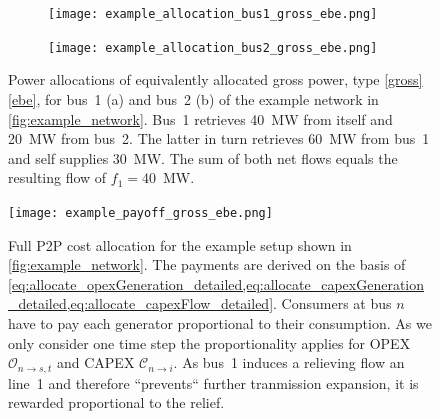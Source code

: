 \documentclass[11pt,twocolumn]{article}
\newcommand{\opex}{\mathcal{O}}
\newcommand{\allocateopex}[1][n \rightarrow s]{\opex_{#1,t}}
\begin{document}
% 
\begin{figure}[h!]
    \begin{subfigure}[c]{.495\linewidth}
    \texttt{[image: example\_allocation\_bus1\_gross\_ebe.png]}
    \vspace{-40pt}
    \subcaption{}
    \label{fig:example_allocation_bus1}
    \end{subfigure}
    \begin{subfigure}[c]{.495\linewidth}
    \texttt{[image: example\_allocation\_bus2\_gross\_ebe.png]}
    \vspace{-40pt}
    \subcaption{}
    \label{fig:example_allocation_bus2_gross_ebe}
    \end{subfigure}
    \caption{Power allocations of equivalently allocated gross power, type \ref{gross}\ref{ebe}, for bus~1 (a) and bus~2 (b) of the example network in \cref{fig:example_network}. Bus~1 retrieves 40~MW from itself and 20~MW from bus~2. The latter in turn retrieves 60~MW from bus~1 and self supplies 30~MW.
    The sum of both net flows equals the resulting flow of $f_1=40$~MW. \vspace{-0pt}}
    \label{fig:example_allocation}
\end{figure}
% 
% 
\begin{figure}[h]
    \centering
    \texttt{[image: example\_payoff\_gross\_ebe.png]}
    \caption{Full P2P cost allocation for the example setup shown in \cref{fig:example_network}. The payments are derived on the basis of \cref{eq:allocate_opexGeneration_detailed,eq:allocate_capexGeneration_detailed,eq:allocate_capexFlow_detailed}. Consumers at bus $n$ have to pay each generator proportional to their consumption. As we only consider one time step the proportionality applies for OPEX $\allocateopex$ and CAPEX $\mathcal{C}_{n \rightarrow i}$. As bus~1 induces a relieving flow an line~1 and therefore ``prevents`` further tranmission expansion, it is rewarded proportional to the relief.}
    \label{fig:example_payoff}
\end{figure}    
% 
% 
% 
\end{document}
